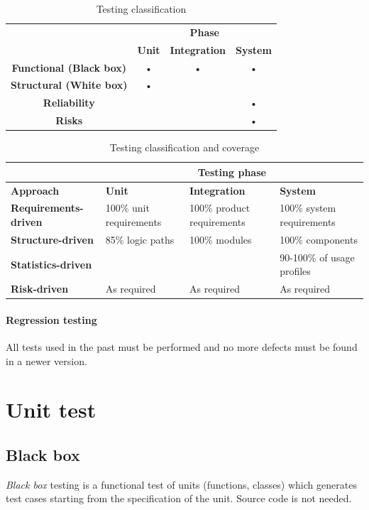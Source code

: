 \begin{table}
\centering
\begin{tabular}{|c|c|c|c|}
\hline 
\multirow{2}{*}{} & \multicolumn{3}{c|}{\textbf{Phase}} \\ 
\cline{2-4}
 & \textbf{Unit} & \textbf{Integration} & \textbf{System} \\ 
\hline 
\textbf{Functional (Black box)} & • & • & • \\ 
\hline 
\textbf{Structural (White box)} & • &  & \\ 
\hline 
\textbf{Reliability} & & & • \\ 
\hline 
\textbf{Risks} & & & • \\ 
\hline 
\end{tabular}
\caption{Testing classification}
\end{table}

\begin{table}
\centering
\small
\begin{tabularx}{\textwidth}{|X|X|X|X|}
\hline 
 & \multicolumn{3}{c|}{\textbf{Testing phase}} \\ 
\hline
\textbf{Approach} & \textbf{Unit} & \textbf{Integration} & \textbf{System} \\ 
\hline 
\textbf{Requirements-driven} & 100\% unit requirements & 100\% product requirements & 100\% system requirements \\ 
\hline 
\textbf{Structure-driven} & 85\% logic paths & 100\% modules & 100\% components \\ 
\hline 
\textbf{Statistics-driven} & & & 90-100\% of usage profiles \\ 
\hline 
\textbf{Risk-driven} & As required & As required & As required \\ 
\hline 
\end{tabularx}
\caption{Testing classification and coverage}
\end{table}

\paragraph{Regression testing}
All tests used in the past must be performed and no more defects must be found in a newer version.

\section{Unit test}
\subsection{Black box}
\emph{Black box} testing is a functional test of units (functions, classes) which generates test cases starting from the specification of the unit. Source code is not needed.

